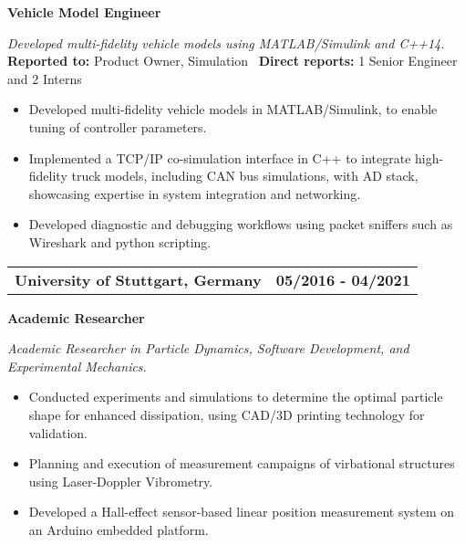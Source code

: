 \documentclass[a4paper,10pt]{article}
\begin{document}
\noindent
\colorbox{gray!40}{%
    \parbox{0.99\textwidth}{%
        \textcolor{highlightcolor}{\textbf{Vehicle Model Engineer}}
    }%
}

\vspace{0.2cm}
\noindent
\textit{Developed multi-fidelity vehicle models using MATLAB/Simulink and C++14.}\\

\vspace{-0.3cm}
\noindent
\textbf{Reported to:} Product Owner, Simulation \, \textbf{Direct reports:} 1 Senior Engineer and 2 Interns\,
\begin{itemize}[itemsep=0pt, topsep=5pt]
    \item Developed multi-fidelity vehicle models in MATLAB/Simulink, to enable tuning of controller parameters.
    \item Implemented a TCP/IP co-simulation interface in C++ to integrate
        high-fidelity truck models, including CAN bus simulations, with AD
        stack, showcasing expertise in system integration and networking.
    \item Developed diagnostic and debugging workflows using packet sniffers such as Wireshark and python scripting.
\end{itemize}

\vspace{0.3cm}
\noindent
\begin{tabular}{ @{\hskip 0pt}m{} >{\raggedleft\arraybackslash}p{} }
    \noindent\textbf{University of Stuttgart, Germany} & \textbf{05/2016 - 04/2021}
\end{tabular}

\noindent
\colorbox{gray!40}{%
    \parbox{0.99\textwidth}{%
        \textcolor{highlightcolor}{\textbf{Academic Researcher}}
    }%
}

\vspace{0.2cm}
\noindent
\textit{Academic Researcher in Particle Dynamics, Software Development, and Experimental Mechanics.}\\
\vspace{-0.4cm}
\noindent
\begin{itemize}[itemsep=0pt, topsep=5pt]
    \item Conducted experiments and simulations to determine the optimal
        particle shape for enhanced dissipation, using CAD/3D printing
        technology for validation.
    \item Planning and execution of measurement campaigns of
        virbational structures using Laser-Doppler Vibrometry.
    \item Developed a Hall-effect sensor-based linear position measurement system on an Arduino embedded platform.
\end{itemize}
\end{document}
